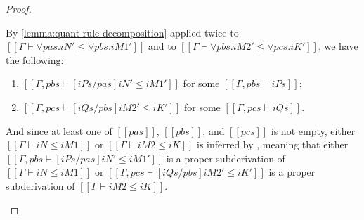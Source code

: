 \begin{proof}
\begin{caseof}
      By \cref{lemma:quant-rule-decomposition} applied twice
      to $[[Γ ⊢ ∀pas.iN' ≤ ∀pbs.iM1']]$ and to $[[Γ ⊢ ∀pbs.iM2' ≤ ∀pcs.iK']]$,
      we have the following:
      \begin{enumerate}
        \item $[[Γ, pbs ⊢ [iPs/pas]iN' ≤ iM1']]$ for some $[[Γ, pbs ⊢ iPs]]$;
        \item $[[Γ, pcs ⊢ [iQs/pbs]iM2' ≤ iK']]$ for some $[[Γ, pcs ⊢ iQs]]$.
      \end{enumerate}
      And since at least one of 
      $[[pas]]$, $[[pbs]]$, and $[[pcs]]$ is not empty,
      either $[[Γ ⊢ iN ≤ iM1]]$ or $[[Γ ⊢ iM2 ≤ iK]]$ is inferred 
      by , meaning that either 
      $[[Γ, pbs ⊢ [iPs/pas]iN' ≤ iM1']]$ is a proper subderivation of $[[Γ ⊢ iN ≤ iM1]]$ or
      $[[Γ, pcs ⊢ [iQs/pbs]iM2' ≤ iK']]$ is a proper subderivation of $[[Γ ⊢ iM2 ≤ iK]]$.


\end{caseof}
\end{proof}
